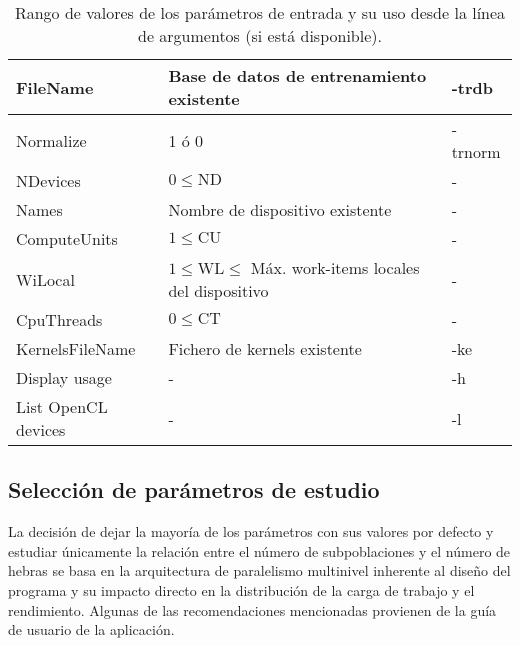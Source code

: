 \begin{table}[htbp]
\begin{tabular}{|p{3cm}|p{6cm}|p{2.2cm}|}
        FileName            & Base de datos de entrenamiento existente                                & -trdb               \\ \hline
        Normalize           & 1 ó 0                                                                   & -trnorm             \\ \hline
        NDevices            & $0 \leq \mathrm{ND}$                                                    & -                   \\ \hline
        Names               & Nombre de dispositivo existente                                         & -                   \\ \hline
        ComputeUnits        & $1 \leq \mathrm{CU}$                                                    & -                   \\ \hline
        WiLocal             & $1 \leq \mathrm{WL} \leq$ Máx. work-items locales del dispositivo       & -                   \\ \hline
        CpuThreads          & $0 \leq \mathrm{CT}$                                                    & -                   \\ \hline
        KernelsFileName     & Fichero de kernels existente                                            & -ke                 \\ \hline
        Display usage       & -                                                                       & -h                  \\ \hline
        List OpenCL devices & -                                                                       & -l                  \\ \hline
    \end{tabular}
    \caption{Rango de valores de los parámetros de entrada y su uso desde la línea de argumentos (si está disponible).}
    \label{tab:hpmoon_parametros}
\end{table}

\subsection{Selección de parámetros de estudio}

La decisión de dejar la mayoría de los parámetros con sus valores por defecto y estudiar únicamente la relación entre el número de subpoblaciones y el número de hebras se basa en la arquitectura de paralelismo multinivel inherente al diseño del programa y su impacto directo en la distribución de la carga de trabajo y el rendimiento. Algunas de las recomendaciones mencionadas provienen de la guía de usuario de la aplicación.

